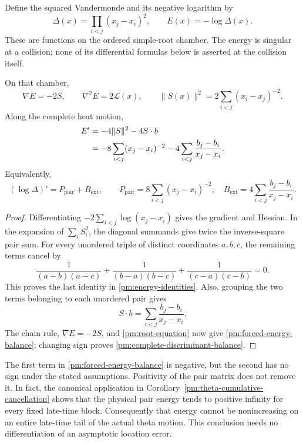 Define the squared Vandermonde and its negative logarithm by
\begin{equation}
 \Delta(x)=\prod_{i<j}(x_j-x_i)^2,
 \qquad E(x)=-\log\Delta(x).
 \label{pm:energy-definition}
\end{equation}
These are functions on the ordered simple-root chamber.  The energy is
singular at a collision; none of its differential formulas below is
asserted at the collision itself.

\begin{lemma}
\label{pm:forced-energy}
On that chamber,
\begin{equation}
 \nabla E=-2S,\qquad \nabla^2E=2\mathcal L(x),\qquad
 \|S(x)\|^2=2\sum_{i<j}(x_i-x_j)^{-2}.
 \label{pm:energy-identities}
\end{equation}
Along the complete heat motion,
\begin{align}
 E'
  &=-4\|S\|^2-4S\mathbin{\cdot}b\notag\\
  &=-8\sum_{i<j}(x_j-x_i)^{-2}
    -4\sum_{i<j}\frac{b_j-b_i}{x_j-x_i}.
 \label{pm:forced-energy-balance}
\end{align}
Equivalently,
\begin{equation}
 (\log\Delta)'=P_{\mathrm{pair}}+B_{\mathrm{ext}},\qquad
 P_{\mathrm{pair}}=8\sum_{i<j}(x_j-x_i)^{-2},\quad
 B_{\mathrm{ext}}=4\sum_{i<j}\frac{b_j-b_i}{x_j-x_i}.
 \label{pm:complete-discriminant-balance}
\end{equation}
\end{lemma}

\begin{proof}
Differentiating \(-2\sum_{i<j}\log(x_j-x_i)\) gives the gradient
and Hessian.  In the expansion of \(\sum_i S_i^2\), the diagonal
summands give twice the inverse-square pair sum.  For every unordered
triple of distinct coordinates \(a,b,c\), the remaining terms cancel by
\[
 \frac1{(a-b)(a-c)}+
 \frac1{(b-a)(b-c)}+
 \frac1{(c-a)(c-b)}=0.
\]
This proves the last identity in \eqref{pm:energy-identities}.
Also, grouping the two terms belonging to each unordered pair gives
\[
 S\mathbin{\cdot}b
 =\sum_{i<j}\frac{b_j-b_i}{x_j-x_i}.
\]
The chain rule, \(\nabla E=-2S\), and
\eqref{pm:root-equation} now give
\eqref{pm:forced-energy-balance}; changing sign proves
\eqref{pm:complete-discriminant-balance}.
\end{proof}

The first term in \eqref{pm:forced-energy-balance} is negative, but the
second has no sign under the stated assumptions.  Positivity of the
pair matrix does not remove it.  In fact, the canonical application in
Corollary~\ref{pm:theta-cumulative-cancellation} shows that the physical
pair energy tends to positive infinity for every fixed late-time block.
Consequently that energy cannot be nonincreasing on an entire late-time
tail of the actual theta motion.  This conclusion needs no differentiation
of an asymptotic location error.

